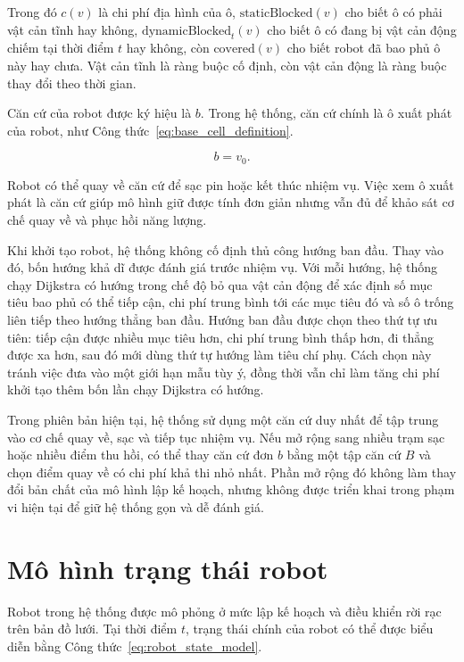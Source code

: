 \documentclass[../DoAn.tex]{subfiles}
\begin{document}
Trong đó $c(v)$ là chi phí địa hình của ô, $\text{staticBlocked}(v)$ cho biết ô có phải vật cản tĩnh hay không, $\text{dynamicBlocked}_t(v)$ cho biết ô có đang bị vật cản động chiếm tại thời điểm $t$ hay không, còn $\text{covered}(v)$ cho biết robot đã bao phủ ô này hay chưa. Vật cản tĩnh là ràng buộc cố định, còn vật cản động là ràng buộc thay đổi theo thời gian.

Căn cứ của robot được ký hiệu là $b$. Trong hệ thống, căn cứ chính là ô xuất phát của robot, như Công thức~\ref{eq:base_cell_definition}.

\begin{equation}
    b = v_0.
    \label{eq:base_cell_definition}
\end{equation}

Robot có thể quay về căn cứ để sạc pin hoặc kết thúc nhiệm vụ. Việc xem ô xuất phát là căn cứ giúp mô hình giữ được tính đơn giản nhưng vẫn đủ để khảo sát cơ chế quay về và phục hồi năng lượng.

Khi khởi tạo robot, hệ thống không cố định thủ công hướng ban đầu. Thay vào đó, bốn hướng khả dĩ được đánh giá trước nhiệm vụ. Với mỗi hướng, hệ thống chạy Dijkstra có hướng trong chế độ bỏ qua vật cản động để xác định số mục tiêu bao phủ có thể tiếp cận, chi phí trung bình tới các mục tiêu đó và số ô trống liên tiếp theo hướng thẳng ban đầu. Hướng ban đầu được chọn theo thứ tự ưu tiên: tiếp cận được nhiều mục tiêu hơn, chi phí trung bình thấp hơn, đi thẳng được xa hơn, sau đó mới dùng thứ tự hướng làm tiêu chí phụ. Cách chọn này tránh việc đưa vào một giới hạn mẫu tùy ý, đồng thời vẫn chỉ làm tăng chi phí khởi tạo thêm bốn lần chạy Dijkstra có hướng.

Trong phiên bản hiện tại, hệ thống sử dụng một căn cứ duy nhất để tập trung vào cơ chế quay về, sạc và tiếp tục nhiệm vụ. Nếu mở rộng sang nhiều trạm sạc hoặc nhiều điểm thu hồi, có thể thay căn cứ đơn $b$ bằng một tập căn cứ $B$ và chọn điểm quay về có chi phí khả thi nhỏ nhất. Phần mở rộng đó không làm thay đổi bản chất của mô hình lập kế hoạch, nhưng không được triển khai trong phạm vi hiện tại để giữ hệ thống gọn và dễ đánh giá.

\section{Mô hình trạng thái robot}

Robot trong hệ thống được mô phỏng ở mức lập kế hoạch và điều khiển rời rạc trên bản đồ lưới. Tại thời điểm $t$, trạng thái chính của robot có thể được biểu diễn bằng Công thức~\ref{eq:robot_state_model}.
\end{document}
